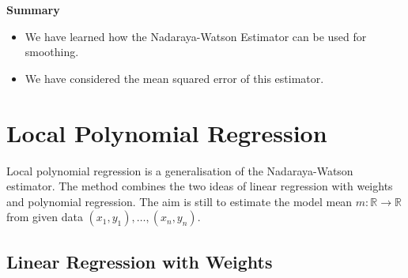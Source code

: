 \documentclass[
  a4paper,
]{article}
\providecommand{\tightlist}{%
  \setlength{\itemsep}{0pt}\setlength{\parskip}{0pt}}
\theoremstyle{definition}
\theoremstyle{definition}
\theoremstyle{definition}
\theoremstyle{definition}
\theoremstyle{remark}
\begin{document}
\textbf{Summary}

\begin{itemize}
\tightlist
\item
  We have learned how the Nadaraya-Watson Estimator can be used
  for smoothing.
\item
  We have considered the mean squared error of this estimator.
\end{itemize}

\clearpage

\hypertarget{X06-locpoly}{%
\section{Local Polynomial Regression}\label{X06-locpoly}}

Local polynomial regression is a generalisation of the
Nadaraya-Watson estimator. The method combines the two ideas of
linear regression with weights and polynomial regression. The aim
is still to estimate the model mean \(m \colon\mathbb{R}\to \mathbb{R}\) from
given data \((x_1, y_1), \ldots, (x_n, y_n)\).

\hypertarget{linear-regression-with-weights}{%
\subsection{Linear Regression with Weights}\label{linear-regression-with-weights}}
\end{document}
